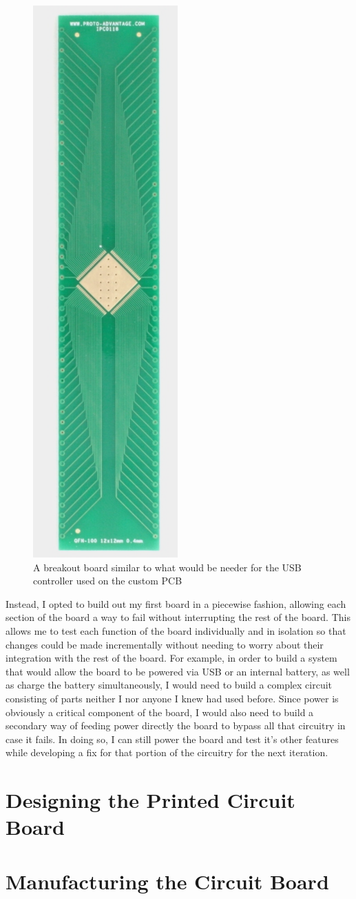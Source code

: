 \begin{figure}[h]
  \centering
  \includegraphics[height=0.9\textwidth,angle=90]{Figures/smt_breakout}
  \captionsetup{width=.8\linewidth}
  \caption[SMD Breakout Board]{A breakout board similar to what would be needer for the USB controller used on the custom PCB}
  \label{fig:smt_breakout}
\end{figure}

Instead, I opted to build out my first board in a piecewise fashion, allowing each section of the board a way to fail without interrupting the rest of the board.
This allows me to test each function of the board individually and in isolation so that changes could be made incrementally without needing to worry about their integration with the rest of the board.
For example, in order to build a system that would allow the board to be powered via USB or an internal battery, as well as charge the battery simultaneously, I would need to build a complex circuit consisting of parts neither I nor anyone I knew had used before.
Since power is obviously a critical component of the board, I would also need to build a secondary way of feeding power directly the board to bypass all that circuitry in case it fails.
In doing so, I can still power the board and test it's other features while developing a fix for that portion of the circuitry for the next iteration.


\section{Designing the Printed Circuit Board}\label{sec:DesigningThePCB}

\todosection


\section{Manufacturing the Circuit Board}\label{sec:ManufacturingThePCB}

\todosection